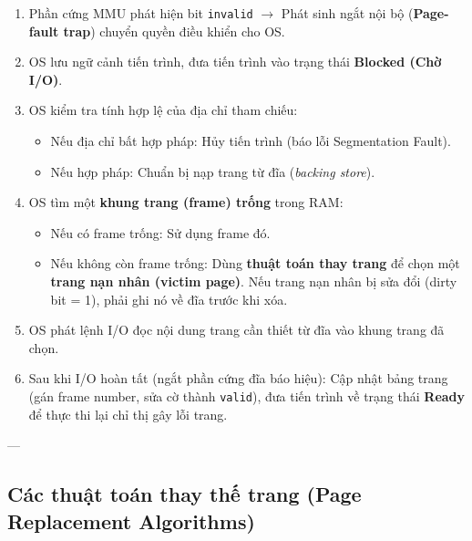 \documentclass[11pt,a4paper]{article}
\begin{document}
\begin{importantbox}
\begin{enumerate}
    \item Phần cứng MMU phát hiện bit \texttt{invalid} $\rightarrow$ Phát sinh ngắt nội bộ (\textbf{Page-fault trap}) chuyển quyền điều khiển cho OS.
    \item OS lưu ngữ cảnh tiến trình, đưa tiến trình vào trạng thái \textbf{Blocked (Chờ I/O)}.
    \item OS kiểm tra tính hợp lệ của địa chỉ tham chiếu:
    \begin{itemize}[noitemsep]
        \item Nếu địa chỉ bất hợp pháp: Hủy tiến trình (báo lỗi Segmentation Fault).
        \item Nếu hợp pháp: Chuẩn bị nạp trang từ đĩa (\textit{backing store}).
    \end{itemize}
    \item OS tìm một \textbf{khung trang (frame) trống} trong RAM:
    \begin{itemize}[noitemsep]
        \item Nếu có frame trống: Sử dụng frame đó.
        \item Nếu không còn frame trống: Dùng \textbf{thuật toán thay trang} để chọn một \textbf{trang nạn nhân (victim page)}. Nếu trang nạn nhân bị sửa đổi (dirty bit = 1), phải ghi nó về đĩa trước khi xóa.
    \end{itemize}
    \item OS phát lệnh I/O đọc nội dung trang cần thiết từ đĩa vào khung trang đã chọn.
    \item Sau khi I/O hoàn tất (ngắt phần cứng đĩa báo hiệu): Cập nhật bảng trang (gán frame number, sửa cờ thành \texttt{valid}), đưa tiến trình về trạng thái \textbf{Ready} để thực thi lại chỉ thị gây lỗi trang.
\end{enumerate}
\end{importantbox}

---

\subsection{Các thuật toán thay thế trang (Page Replacement Algorithms)}
\end{document}
